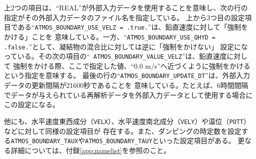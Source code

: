 上2つの項目は、``REAL''が外部入力データを使用することを意味し、次の行の指定がその外部入力データのファイル名を指定している。
上から3つ目の設定項目である``\verb|ATMOS_BOUNDARY_USE_VELZ = .true.|''は、鉛直速度に対して「強制をかける」ことを
意味している。一方、``\verb|ATMOS_BOUNDARY_USE_QHYD = .false.|''として、凝結物の混合比に対しては逆に「強制をかけない」
設定になっている。その次の項目の``\verb| ATMOS_BOUNDARY_VALUE_VELZ|''は、鉛直速度に対して
強制をかける際、ここで指定した値、``0.0 m/s''へ近づくように強制をかけるという指定を意味する。
最後の行の``\verb|ATMOS_BOUNDARY_UPDATE_DT|''は、外部入力データの更新間隔が21600秒であることを
意味している。たとえば、6時間間隔でデータが与えられている再解析データを外部入力データとして使用する場合にこの設定になる。

他にも、水平速度東西成分（\verb|VELX|）、水平速度南北成分（\verb|VELY|）や温位（\verb|POTT|）などに対して同様の設定項目が
存在する。また、ダンピングの時定数を設定する\verb|ATMOS_BOUNDARY_TAUX|や\verb|ATMOS_BOUNDARY_TAUY|といった設定項目がある。
更なる詳細については、付録\ref{app:namelist}を参照のこと。




